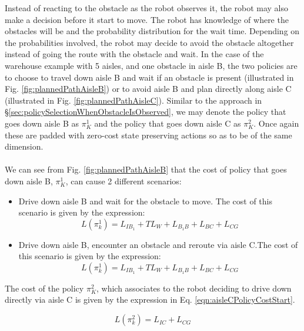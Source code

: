 \documentclass[a4paper,12pt]{article}
\begin{document}
			 Instead of reacting to the obstacle as the robot observes it, the robot may also make a decision before it start to move. The robot has knowledge of where the obstacles will be and the probability distribution for the wait time. Depending on the probabilities involved, the robot may decide to avoid the obstacle altogether instead of going the route with the obstacle and wait. In the case of the warehouse example with 5 aisles, and one obstacle in aisle B, the two policies are to choose to travel down aisle B and wait if an obstacle is present (illustrated in Fig. \ref{fig:plannedPathAisleB}) or to avoid aisle B and plan directly along aisle C (illustrated in Fig. \ref{fig:plannedPathAisleC}). Similar to the approach in \S \ref{sec:policySelectionWhenObstacleIsObserved}, we may denote the policy that goes down aisle B as $\pi_{K}^{1}$ and the policy that goes down aisle C as $\pi_{K}^{2}$. Once again these are padded with zero-cost state preserving actions so as to be of the same dimension. 
			\\
			\\
			We can see from Fig. \ref{fig:plannedPathAisleB} that the cost of policy that goes down aisle B, $\pi_{K}^{1}$, can cause 2 different scenarios: 
			\begin{itemize}
				\item Drive down aisle B and wait for the obstacle to move. The cost of this scenario is given by the expression:
				\begin{equation}
				L(\pi_k^1) = L_{IB_1}+TL_W+L_{B_1B}+L_{BC}+L_{CG}
				\label{eqn:waitPolicyCostStart1}
				\end{equation}
				\item Drive down aisle B, encounter an obstacle and reroute via aisle C.The cost of this scenario is given by the expression:
				\begin{equation}
				L(\pi_k^1) = L_{IB_1}+TL_W+L_{B_1B}+L_{BC}+L_{CG}
				\label{eqn:waitPolicyCostStart2}
				\end{equation}
			\end{itemize}
			
			The cost of the policy $\pi_{K}^{2}$, which associates to the robot deciding to drive down directly via aisle C is given by the expression in Eq. \ref{eqn:aisleCPolicyCostStart}.
			
			\begin{equation}
			L(\pi_k^2) = L_{IC}+L_{CG}
			\label{eqn:aisleCPolicyCostStart}
			\end{equation}
			
\end{document}

